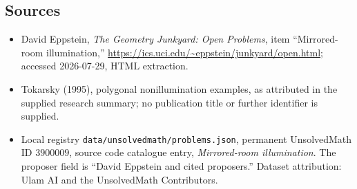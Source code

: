 \documentclass[11pt]{article}
\begin{document}
\subsection{Sources}
\begin{itemize}
\item David Eppstein, \emph{The Geometry Junkyard: Open Problems}, item ``Mirrored-room illumination,'' \url{https://ics.uci.edu/~eppstein/junkyard/open.html}; accessed 2026-07-29, HTML extraction.
\item Tokarsky (1995), polygonal nonillumination examples, as attributed in the supplied research summary; no publication title or further identifier is supplied.
\item Local registry \texttt{data/unsolvedmath/problems.json}, permanent UnsolvedMath ID $3900009$, source code catalogue entry, \emph{Mirrored-room illumination}. The proposer field is ``David Eppstein and cited proposers.'' Dataset attribution: Ulam AI and the UnsolvedMath Contributors.
\end{itemize}
\end{document}
